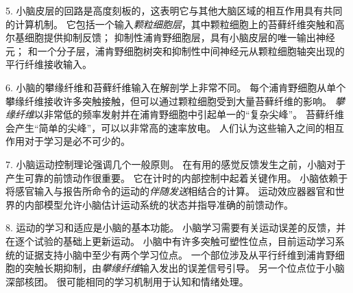 5. 小脑皮层的回路是高度刻板的，这表明它与其他大脑区域的相互作用具有共同的计算机制。
它包括一个输入\textit{颗粒细胞层}，其中颗粒细胞上的苔藓纤维突触和高尔基细胞提供抑制反馈；
抑制性浦肯野细胞层，具有小脑皮层的唯一输出神经元；
和一个分子层，浦肯野细胞树突和抑制性中间神经元从颗粒细胞轴突出现的平行纤维接收输入。


6. 小脑的攀缘纤维和苔藓纤维输入在解剖学上非常不同。
每个浦肯野细胞从单个攀缘纤维接收许多突触接触，但可以通过颗粒细胞受到大量苔藓纤维的影响。
\textit{攀缘纤维}以非常低的频率发射并在浦肯野细胞中引起单一的“复杂尖峰”。
苔藓纤维会产生“简单的尖峰”，可以以非常高的速率放电。
人们认为这些输入之间的相互作用对于学习是必不可少的。


7. 小脑运动控制理论强调几个一般原则。
在有用的感觉反馈发生之前，小脑对于产生可靠的前馈动作很重要。
它在计时的内部控制中起着关键作用。
小脑依赖于将感官输入与报告所命令的运动的\textit{伴随发送}相结合的计算。
运动效应器器官和世界的内部模型允许小脑估计运动系统的状态并指导准确的前馈动作。


8. 运动的学习和适应是小脑的基本功能。
小脑学习需要有关运动误差的反馈，并在逐个试验的基础上更新运动。
小脑中有许多突触可塑性位点，目前运动学习系统的证据支持小脑中至少有两个学习位点。
一个部位涉及从平行纤维到浦肯野细胞的突触长期抑制，由\textit{攀缘纤维}输入发出的误差信号引导。
另一个位点位于小脑深部核团。
很可能相同的学习机制用于认知和情绪处理。



